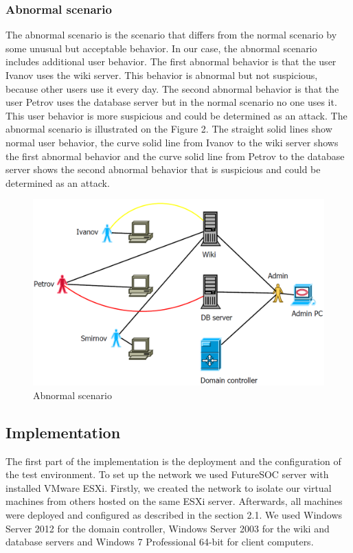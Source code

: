 \subsubsection{Abnormal scenario}
The abnormal scenario is the scenario that differs from the normal scenario by some unusual but acceptable behavior. In our case, the abnormal scenario includes additional user behavior. The first abnormal behavior is that the user Ivanov uses the wiki server. This behavior is abnormal but not suspicious, because other users use it every day. The second abnormal behavior is that the user Petrov uses the database server but in the normal scenario no one uses it. This user behavior is more suspicious and could be determined as an attack. The abnormal scenario is illustrated on the Figure 2. The straight solid lines show normal user behavior, the curve solid line from Ivanov to the wiki server shows the first abnormal behavior and the curve solid line from Petrov to the database server shows the second abnormal behavior that is suspicious and could be determined as an attack. 
\begin{figure}[ht!]
\centering
\includegraphics[width=\textwidth]{scenario_abnormal.png}
\caption{Abnormal scenario}
\label{overflow}
\end{figure}

\subsection{Implementation}
The first part of the implementation is the deployment and the configuration of the test environment. To set up the network we used FutureSOC server with installed VMware ESXi. Firstly, we created the network to isolate our virtual machines from others hosted on the same ESXi server. Afterwards, all machines were deployed and configured as described in the section 2.1. We used Windows Server 2012 for the domain controller, Windows Server 2003 for the wiki and database servers and Windows 7 Professional 64-bit for client computers. 

